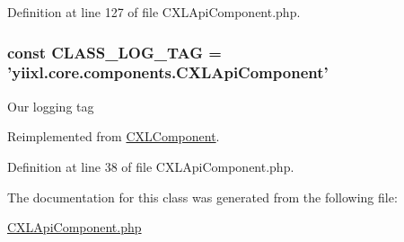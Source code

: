 Definition at line 127 of file CXLApiComponent.php.

\hypertarget{classCXLApiComponent_aa607ab5e557e6ebb60b85c5a20ad067f}{
\subsubsection[{CLASS\_\-LOG\_\-TAG}]{\setlength{\rightskip}{0pt plus 5cm}const {\bf CLASS\_\-LOG\_\-TAG} = 'yiixl.core.components.CXLApiComponent'}}
\label{classCXLApiComponent_aa607ab5e557e6ebb60b85c5a20ad067f}
Our logging tag 

Reimplemented from \hyperlink{classCXLComponent_aa607ab5e557e6ebb60b85c5a20ad067f}{CXLComponent}.



Definition at line 38 of file CXLApiComponent.php.



The documentation for this class was generated from the following file:\begin{DoxyCompactItemize}
\item 
\hyperlink{CXLApiComponent_8php}{CXLApiComponent.php}\end{DoxyCompactItemize}

